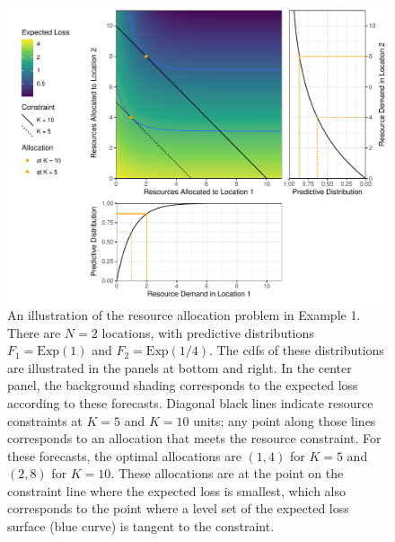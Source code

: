 \documentclass{article}\usepackage[]{graphicx}\usepackage[]{xcolor}
\begin{document}
\begin{figure}
    \includegraphics[width=\textwidth]{../figures/exponential_pred_expected_loss.pdf}
    \caption{An illustration of the resource allocation problem in Example 1. There are $N = 2$ locations, with predictive distributions $F_1 = \mathrm{Exp}(1)$ and $F_2 = \mathrm{Exp}(1/4)$. The cdfs of these distributions are illustrated in the panels at bottom and right. In the center panel, the background shading corresponds to the expected loss according to these forecasts. Diagonal black lines indicate resource constraints at $K=5$ and $K=10$ units; any point along those lines corresponds to an allocation that meets the resource constraint. For these forecasts, the optimal allocations are $(1, 4)$ for $K=5$ and $(2, 8)$ for $K=10$. These allocations are at the point on the constraint line where the expected loss is smallest, which also corresponds to the point where a level set of the expected loss surface (blue curve) is tangent to the constraint.}
    \label{fig:exp_alloc_example}
\end{figure}
\end{document}
